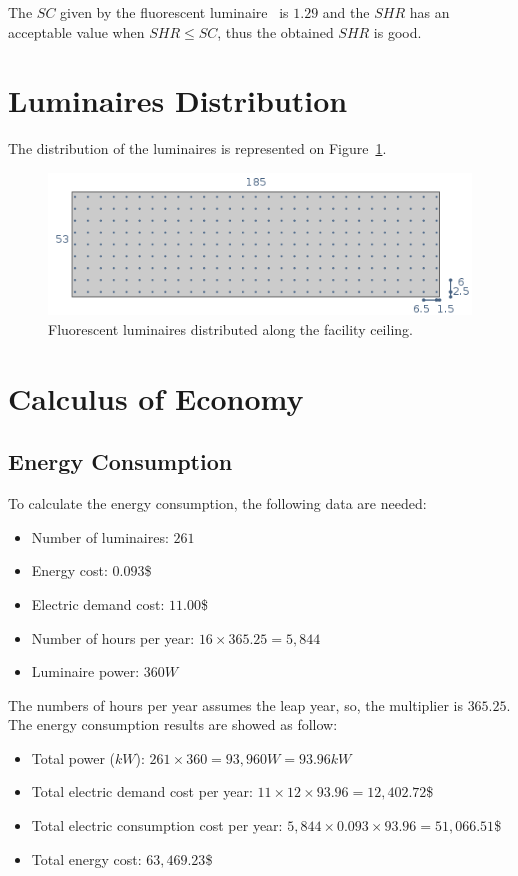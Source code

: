The $SC$ given by the fluorescent luminaire~\cite{www:fluo_photometric} is $1.29$ and the $SHR$ has an acceptable value when $SHR \leq SC$, thus the obtained $SHR$ is good.

\section{Luminaires Distribution}
The distribution of the luminaires is represented on Figure~\ref{fig:fluo_dist}.
\begin{figure}[h!]
\centering
\includegraphics[width=.9\textwidth]{./figs/fluo_dist.png}
\caption{Fluorescent luminaires distributed along the facility ceiling.}
\label{fig:fluo_dist}
\end{figure}

\section{Calculus of Economy}

\subsection{Energy Consumption}
To calculate the energy consumption, the following data are needed:
\begin{itemize}
\item Number of luminaires: $261$
\item Energy cost: $0.093$\$
\item Electric demand cost: $11.00$\$
\item Number of hours per year: $16 \times 365.25 = 5,844$
\item Luminaire power: $360 W$
\end{itemize}
The numbers of hours per year assumes the leap year, so, the multiplier is $365.25$. The energy consumption results are showed as follow:
\begin{itemize}
\item Total power ($kW$): $261 \times 360 = 93,960 W = 93.96 kW$
\item Total electric demand cost per year: $11 \times 12 \times 93.96 = 12,402.72$\$
\item Total electric consumption cost per year: $5,844 \times 0.093 \times 93.96 = 51,066.51$\$
\item Total energy cost: $63,469.23$\$
\end{itemize}

